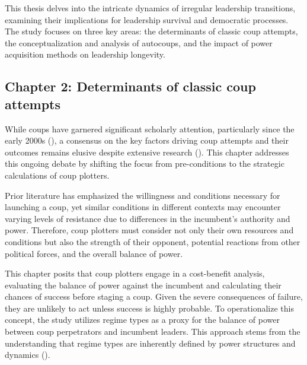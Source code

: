 \documentclass[
  12pt,
]{report}
\begin{document}
This thesis delves into the intricate dynamics of irregular leadership
transitions, examining their implications for leadership survival and
democratic processes. The study focuses on three key areas: the
determinants of classic coup attempts, the conceptualization and
analysis of autocoups, and the impact of power acquisition methods on
leadership longevity.

\subsection*{Chapter 2: Determinants of classic coup
attempts}\label{chapter-2-determinants-of-classic-coup-attempts}

While coups have garnered significant scholarly attention, particularly
since the early 2000s (),
a consensus on the key factors driving coup attempts and their outcomes
remains elusive despite extensive research
(). This
chapter addresses this ongoing debate by shifting the focus from
pre-conditions to the strategic calculations of coup plotters.

Prior literature has emphasized the willingness and conditions necessary
for launching a coup, yet similar conditions in different contexts may
encounter varying levels of resistance due to differences in the
incumbent's authority and power. Therefore, coup plotters must consider
not only their own resources and conditions but also the strength of
their opponent, potential reactions from other political forces, and the
overall balance of power.

This chapter posits that coup plotters engage in a cost-benefit
analysis, evaluating the balance of power against the incumbent and
calculating their chances of success before staging a coup. Given the
severe consequences of failure, they are unlikely to act unless success
is highly probable. To operationalize this concept, the study utilizes
regime types as a proxy for the balance of power between coup
perpetrators and incumbent leaders. This approach stems from the
understanding that regime types are inherently defined by power
structures and dynamics ().
\end{document}
